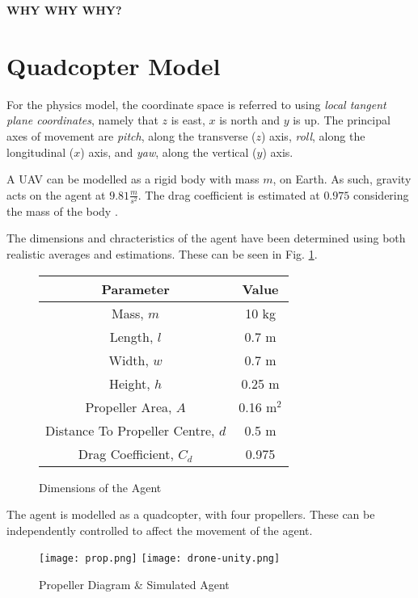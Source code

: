 \documentclass[../report.tex]{subfiles}
\begin{document}
\textbf{WHY WHY WHY?}

\section{Quadcopter Model}

For the physics model, the coordinate space is referred to using \emph{local tangent plane coordinates}, namely that $z$ is east, $x$ is north and $y$ is up. The principal axes of movement are \emph{pitch}, along the transverse ($z$) axis, \emph{roll}, along the longitudinal ($x$) axis, and \emph{yaw}, along the vertical ($y$) axis.

A UAV can be modelled as a rigid body with mass $m$, on Earth. As such, gravity acts on the agent at $9.81\frac{m}{s^2}$. The drag coefficient is estimated at $0.975$ considering the mass of the body \cite{Hattenberger}.

The dimensions and chracteristics of the agent have been determined using both realistic averages \cite{Figliozzi} and estimations. These can be seen in Fig. \ref{fig:dimensions}.

\begin{figure}[H]
    \centering
    \begin{tabular}{| c | c |} 
    \hline
    Parameter & Value \\ 
    \hline
    Mass, $m$ & 10 kg \\
    \hline
    Length, $l$ & 0.7 m \\
    \hline
    Width, $w$ & 0.7 m \\
    \hline
    Height, $h$ & 0.25 m \\
    \hline
    Propeller Area, $A$ & 0.16 m$^2$ \\
    \hline
    Distance To Propeller Centre, $d$ & 0.5 m \\
    \hline
    Drag Coefficient, $C_d$ & 0.975 \\
    \hline
    \end{tabular}
    \caption{Dimensions of the Agent}
    \label{fig:dimensions}
\end{figure}

The agent is modelled as a quadcopter, with four propellers. These can be independently controlled to affect the movement of the agent.

\begin{figure}[H]
    \centering
    \texttt{[image: prop.png]}
    \hspace{1cm}
    \texttt{[image: drone-unity.png]}
    \caption{Propeller Diagram \& Simulated Agent}
\end{figure}
\end{document}

